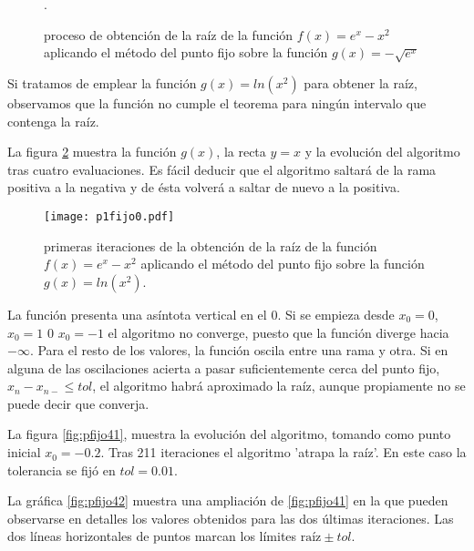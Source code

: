 \begin{figure}
\centering
{} \qquad
{}\\
\qquad
{}\\
\qquad
{}
\caption{proceso de obtención de la raíz de la función $f(x)=e^x-x^2$ aplicando el método del punto fijo sobre la función $g(x)=-\sqrt{e^x}$}.
\label{fig:pfijo2}
\end{figure}

Si tratamos de emplear la función $g(x)=ln(x^2)$ para obtener la raíz, observamos que la función no cumple el teorema para ningún intervalo que contenga la raíz. 

La figura \ref{fig:pfijo03} muestra la función $g(x)$, la recta $y=x$ y la evolución del algoritmo tras cuatro evaluaciones. Es fácil deducir que el algoritmo saltará de la rama positiva a la negativa y de ésta volverá a saltar de nuevo a la positiva. 

\begin{figure}[h]
\texttt{[image: p1fijo0.pdf]}
\caption{primeras iteraciones de la obtención de la raíz de la función $f(x)=e^x-x^2$ aplicando el método del punto fijo sobre la función $g(x)=ln(x^2)$.}
\label{fig:pfijo03}
\end{figure}

La función presenta una asíntota vertical en el $0$. Si se empieza desde $x_0=0$, $x_0=1$ 0 $x_0=-1$ el algoritmo no converge, puesto que la función diverge hacia $-\infty$. Para el resto de los valores, la función oscila entre una rama y otra. Si en alguna de las oscilaciones acierta a pasar suficientemente cerca del punto fijo, $x_n-x_{n-} \leq tol$, el algoritmo habrá aproximado la raíz, aunque propiamente no se puede decir que converja.

 La figura \ref{fig:pfijo41}, muestra la evolución del algoritmo, tomando como punto inicial $x_0=-0.2$.  Tras 211 iteraciones el algoritmo 'atrapa la raíz'. En este caso la tolerancia se fijó en $tol=0.01$.  
 
 La gráfica \ref{fig:pfijo42} muestra una ampliación de \ref{fig:pfijo41} en la que pueden observarse en detalles los valores obtenidos para las dos últimas iteraciones. Las dos líneas horizontales de puntos marcan los límites $\text{raíz}\pm tol$. 
 
